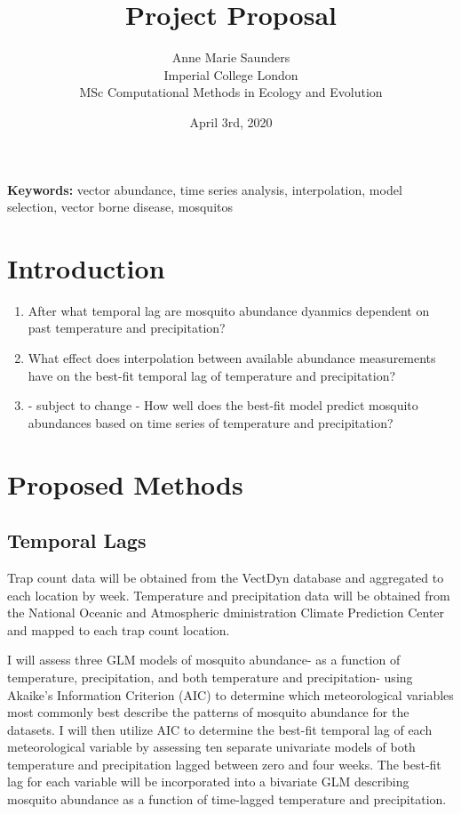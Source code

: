 \documentclass[11pt, a4paper]{article}
\title{Project Proposal}
\author{Anne Marie Saunders\\
	Imperial College London\\
	MSc Computational Methods in Ecology and Evolution\\}
\date{April 3rd, 2020}
\begin{document}
\begin{titlepage}
	\maketitle
\end{titlepage}

\textbf{Keywords:} vector abundance, time series analysis, interpolation, model selection, vector borne disease, mosquitos\\

\section{Introduction}

\begin{enumerate}
	\item After what temporal lag are mosquito abundance dyanmics dependent on past temperature and precipitation?
	
	\item What effect does interpolation between available abundance measurements have on the best-fit temporal lag of temperature and precipitation?
	
	\item - subject to change - How well does the best-fit model predict mosquito abundances based on time series of temperature and precipitation?
	
\end{enumerate}

\section{Proposed Methods}

\subsection{Temporal Lags}
Trap count data will be obtained from the VectDyn database and aggregated to each location by week. Temperature and precipitation data will be obtained from the National Oceanic and Atmospheric dministration Climate Prediction Center and mapped to each trap count location. 

I will assess three GLM models of mosquito abundance- as a function of temperature, precipitation, and both temperature and precipitation-  using Akaike's Information Criterion (AIC) to determine which meteorological variables most commonly best describe the patterns of mosquito abundance for the datasets. I will then utilize AIC to determine the best-fit temporal lag of each meteorological variable by assessing ten separate univariate models of both temperature and precipitation lagged between zero and four weeks. The best-fit lag for each variable will be incorporated into a bivariate GLM describing mosquito abundance as a function of time-lagged temperature and precipitation.
\end{document}
